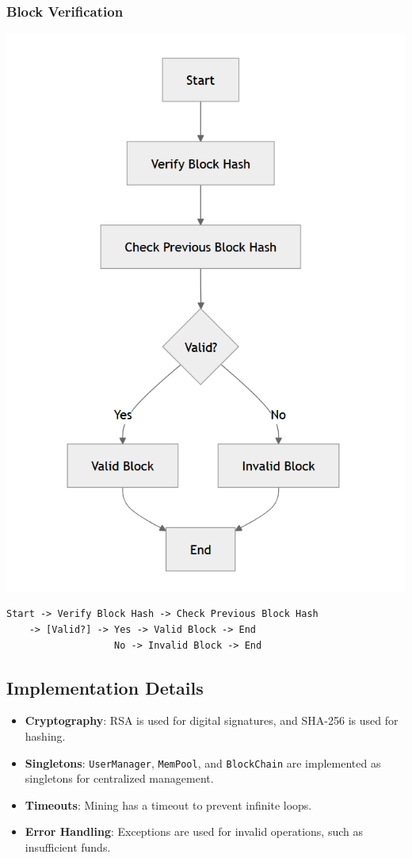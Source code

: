 \documentclass[12pt]{article}
\begin{document}
\subsubsection{Block Verification}
\includegraphics[]{images/5_4_3.PNG}
\begin{verbatim}
Start -> Verify Block Hash -> Check Previous Block Hash
    -> [Valid?] -> Yes -> Valid Block -> End
                   No -> Invalid Block -> End
\end{verbatim}

\subsection{Implementation Details}
\begin{itemize}
    \item \textbf{Cryptography}: RSA is used for digital signatures, and SHA-256 is used for hashing.
    \item \textbf{Singletons}: \texttt{UserManager}, \texttt{MemPool}, and \texttt{BlockChain} are implemented as singletons for centralized management.
    \item \textbf{Timeouts}: Mining has a timeout to prevent infinite loops.
    \item \textbf{Error Handling}: Exceptions are used for invalid operations, such as insufficient funds.
\end{itemize}
\end{document}
